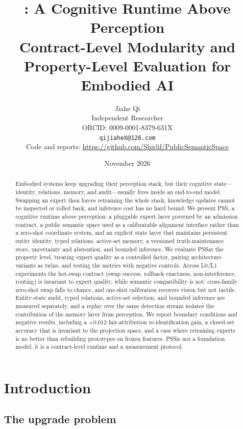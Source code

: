 \documentclass[10pt]{article}
\title{\pss: A Cognitive Runtime Above Perception\\[3pt]
\large Contract-Level Modularity and Property-Level Evaluation for Embodied AI}
\author{Jiahe Qi\\
Independent Researcher\\
ORCID: 0009-0001-8379-631X\\
\texttt{qijiaheX@126.com}\\
\small Code and reports: \url{https://github.com/Shirlif/PublicSemanticSpace}}
\date{November 2026}
\newcommand{\pss}{PSS}
\begin{document}
\setlength{\tabcolsep}{8pt}
\renewcommand{\arraystretch}{1.05}

\maketitle

\begin{abstract}
Embodied systems keep upgrading their perception stack, but their cognitive
state---identity, relations, memory, and audit---usually lives inside an
end-to-end model. Swapping an expert then forces retraining the whole stack,
knowledge updates cannot be inspected or rolled back, and inference cost has no
hard bound. We present \pss, a cognitive runtime above perception: a pluggable
expert layer governed by an admission contract, a public semantic space used as
a calibratable alignment interface rather than a zero-shot coordinate system,
and an explicit state layer that maintains persistent entity identity, typed
relations, active-set memory, a versioned truth-maintenance store, uncertainty
and abstention, and bounded inference. We evaluate \pss at the property level,
treating expert quality as a controlled factor, pairing architecture variants
as twins, and testing the metrics with negative controls. Across L0/L1
experiments the hot-swap contract (swap success, rollback exactness,
non-interference, routing) is invariant to expert quality, while semantic
compatibility is not: cross-family zero-shot swap falls to chance, and one-shot
calibration recovers vision but not tactile. Entity-state audit, typed
relations, active-set selection, and bounded inference are measured separately,
and a replay over the same detection stream isolates the contribution of the
memory layer from perception. We report boundary conditions and negative
results, including a $+0.012$ fair-attribution re-identification gain, a
closed-set accuracy that is invariant to the projection space, and a case where
retraining experts is no better than rebuilding prototypes on frozen features.
\pss is not a foundation model; it is a contract-level runtime and a
measurement protocol.
\end{abstract}

\section{Introduction}
\label{sec:intro}

\subsection{The upgrade problem}
\end{document}

